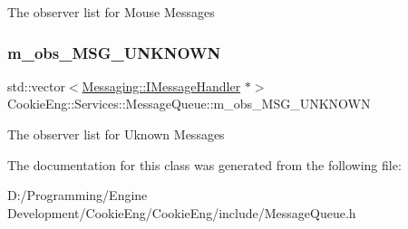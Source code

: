 The observer list for Mouse Messages \mbox{\label{class_cookie_eng_1_1_services_1_1_message_queue_a377d77776078730deac58602ab35bf6c}} 
\subsubsection{\texorpdfstring{m\+\_\+obs\+\_\+\+M\+S\+G\+\_\+\+U\+N\+K\+N\+O\+WN}{m\_obs\_MSG\_UNKNOWN}}
{\footnotesize\ttfamily std\+::vector$<$\hyperlink{class_cookie_eng_1_1_messaging_1_1_i_message_handler}{Messaging\+::\+I\+Message\+Handler} $\ast$$>$ Cookie\+Eng\+::\+Services\+::\+Message\+Queue\+::m\+\_\+obs\+\_\+\+M\+S\+G\+\_\+\+U\+N\+K\+N\+O\+WN\hspace{0.3cm}{\ttfamily [protected]}}

The observer list for Uknown Messages 

The documentation for this class was generated from the following file\+:\begin{DoxyCompactItemize}
\item 
D\+:/\+Programming/\+Engine Development/\+Cookie\+Eng/\+Cookie\+Eng/include/Message\+Queue.\+h\end{DoxyCompactItemize}
